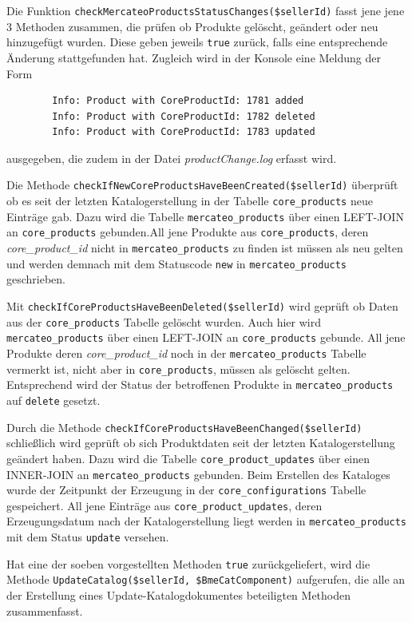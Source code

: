 	Die Funktion \texttt{checkMercateoProductsStatusChanges(\$sellerId)} fasst jene
 	jene 3 Methoden zusammen, die prüfen ob Produkte gelöscht, geändert oder neu hinzugefügt wurden. Diese geben jeweils \texttt{true} zurück, falls eine entsprechende Änderung stattgefunden hat. Zugleich wird in der Konsole eine Meldung der Form 	
		\begin{lstlisting}
		Info: Product with CoreProductId: 1781 added
		Info: Product with CoreProductId: 1782 deleted
		Info: Product with CoreProductId: 1783 updated
		\end{lstlisting} ausgegeben, die zudem in der Datei \textit{productChange.log} erfasst wird.
			
		Die Methode \texttt{checkIfNewCoreProductsHaveBeenCreated(\$sellerId)} überprüft ob es seit der letzten Katalogerstellung in der Tabelle \texttt{core\_products} neue Einträge gab. Dazu wird die Tabelle \texttt{mercateo\_products} über einen LEFT-JOIN an \texttt{core\_products} gebunden.All jene Produkte aus \texttt{core\_products}, deren \textit{core\_product\_id} nicht in \texttt{mercateo\_products} zu finden ist müssen als neu gelten und werden demnach mit dem Statuscode \texttt{new} in \texttt{mercateo\_products} geschrieben. 
		
	
		Mit \texttt{checkIfCoreProductsHaveBeenDeleted(\$sellerId)} wird geprüft ob Daten aus der \texttt{core\_products} Tabelle gelöscht wurden. Auch hier wird \texttt{mercateo\_products} über einen LEFT-JOIN an \texttt{core\_products} gebunde. All jene Produkte deren \textit{core\_product\_id} 
		noch in der \texttt{mercateo\_products} Tabelle vermerkt ist, nicht aber in \texttt{core\_products}, müssen als gelöscht gelten. Entsprechend wird der Status der betroffenen Produkte in \texttt{mercateo\_products} auf \texttt{delete} gesetzt.
		
		Durch die Methode \texttt{checkIfCoreProductsHaveBeenChanged(\$sellerId)} schließlich wird geprüft ob sich Produktdaten seit der letzten Katalogerstellung geändert haben. Dazu wird die Tabelle \texttt{core\_product\_updates} über einen INNER-JOIN an \texttt{mercateo\_products} gebunden.
		Beim Erstellen des Kataloges wurde der Zeitpunkt der Erzeugung in der \texttt{core\_configurations} Tabelle gespeichert. All jene Einträge aus \texttt{core\_product\_updates}, deren Erzeugungsdatum nach der Katalogerstellung liegt werden in \texttt{mercateo\_products} mit dem Status \texttt{update} versehen.
	
	Hat eine der soeben vorgestellten Methoden \texttt{true} zurückgeliefert, wird die Methode \texttt{UpdateCatalog(\$sellerId, \$BmeCatComponent)} aufgerufen, die alle an der Erstellung eines Update-Katalogdokumentes beteiligten Methoden zusammenfasst.
	
